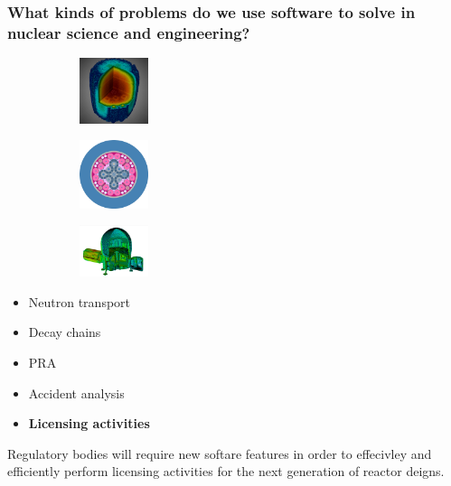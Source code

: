 \begin{frame}
    \frametitle{What kinds of problems do we use software to solve in nuclear science and engineering?}

    \begin{figure}[htpb]
        \centering
        \begin{subfigure}
            \centering
            \includegraphics[width=2cm]{images/exasmr.png}
        \end{subfigure}
        \hspace{1cm}
        \begin{subfigure}
           \centering
           \includegraphics[width=2cm]{images/atr.png} 
        \end{subfigure}
        \hspace{1cm}
        \begin{subfigure}
           \centering
           \includegraphics[width=2cm]{images/hab1.png} 
        \end{subfigure}
    \end{figure}

    \pause\medskip
    \begin{itemize}
        \item Neutron transport
        \item Decay chains
        \item PRA
        \item Accident analysis
        \item {\bf Licensing activities}
    \end{itemize}

    Regulatory bodies will require new softare features in order to effecivley and efficiently perform licensing activities for the next generation of reactor deigns.
\end{frame}

